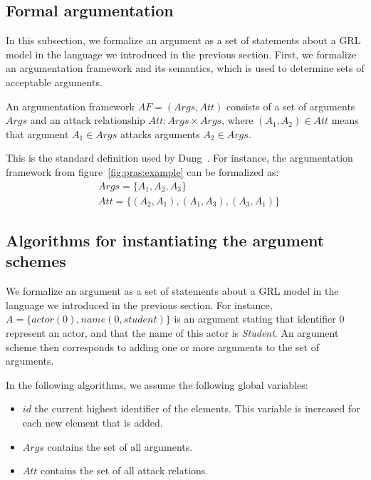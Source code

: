 \subsection{Formal argumentation}

In this subsection, we formalize an argument as a set of statements about a GRL model in the language we introduced in the previous section. First, we formalize an argumentation framework and its semantics, which is used to determine sets of acceptable arguments.

\begin{definition}
An argumentation framework $AF=(Args,Att)$ consists of a set of arguments $Args$ and an attack relationship $Att:Args\times Args$, where $(A_1,A_2)\in Att$ means that argument $A_1\in Args$ attacks arguments $A_2\in Args$.
\end{definition}

\rationale{} This is the standard definition used by Dung~\cite{Dung1995}. For instance, the argumentation framework from figure~\ref{fig:pras:example} can be formalized as:
\begin{align*}
&Args=\{A_1,A_2,A_3\}\\
&Att = \{(A_2,A_1),(A_1,A_3),(A_3,A_1)\}
\end{align*}


\subsection{Algorithms for instantiating the argument schemes}

We formalize an argument as a set of statements about a GRL model in the language we introduced in the previous section. For instance, $A= \{actor(0), name(0,student)\}$ is an argument stating that identifier 0 represent an actor, and that the name of this actor is \emph{Student}. An argument scheme then corresponds to adding one or more arguments to the set of arguments.

In the following algorithms, we assume the following global variables:
\begin{itemize}
\item $id$ the current highest identifier of the elements. This variable is increased for each new element that is added.
\item $Args$ contains the set of all arguments.
\item $Att$ contains the set of all attack relations.
\end{itemize}

